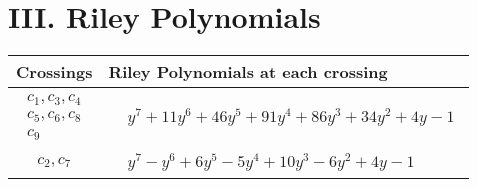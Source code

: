 \documentclass[1p]{elsarticle_modified}
\theoremstyle{definition}
\begin{document}
\centering \section*{ III. Riley Polynomials}
\begin{tabular}{m{50pt}|m{274pt}}
Crossings & \hspace{64pt}Riley Polynomials at each crossing \\
\hline $$\begin{aligned}c_{1},c_{3},c_{4}\\c_{5},c_{6},c_{8}\\c_{9}\end{aligned}$$&$\begin{aligned}
&y^7+11 y^6+46 y^5+91 y^4+86 y^3+34 y^2+4 y-1
\end{aligned}$\\
\hline $$\begin{aligned}c_{2},c_{7}\end{aligned}$$&$\begin{aligned}
&y^7- y^6+6 y^5-5 y^4+10 y^3-6 y^2+4 y-1
\end{aligned}$\\
\hline
\end{tabular}
\vskip 2pc
\end{document}
